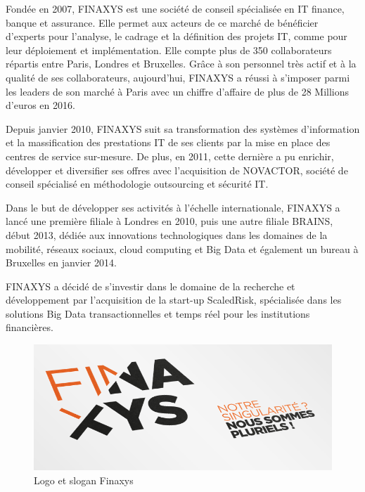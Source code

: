 Fondée en 2007, FINAXYS est une société de conseil spécialisée en IT finance, banque et assurance. Elle permet aux acteurs de ce marché de bénéficier d’experts pour l’analyse, le cadrage et la définition des projets IT, comme pour leur déploiement et implémentation. Elle compte plus de 350 collaborateurs répartis entre Paris, Londres et Bruxelles. Grâce à son personnel très actif et à la qualité de ses collaborateurs, aujourd’hui, FINAXYS a réussi à s’imposer parmi les leaders de son marché à Paris avec un chiffre d’affaire de plus de 28 Millions d’euros en 2016. 
\par Depuis janvier 2010, FINAXYS suit sa transformation des systèmes d’information et la massification des prestations IT de ses clients par la mise en place des centres de service sur-mesure. De plus, en 2011, cette dernière a pu enrichir, développer et diversifier ses offres avec l’acquisition de NOVACTOR, société de conseil spécialisé en méthodologie outsourcing et sécurité IT. 
\par Dans le but de développer ses activités à l’échelle internationale, FINAXYS a lancé une première filiale à Londres en 2010, puis une autre filiale BRAINS, début 2013, dédiée aux innovations technologiques dans les domaines de la mobilité, réseaux sociaux, cloud computing et Big Data et également un bureau à Bruxelles en janvier 2014.
\par FINAXYS a décidé de s’investir dans le domaine de la recherche et développement par l’acquisition de la start-up ScaledRisk, spécialisée dans les solutions Big Data transactionnelles et temps réel pour les institutions financières.

\begin{figure}[ht]
    \centering
    \includegraphics[width=\columnwidth]{img/logomotoFinaxys.png}
    \caption{Logo et slogan Finaxys}
    \label{fig:finaxysLogo}
\end{figure}

